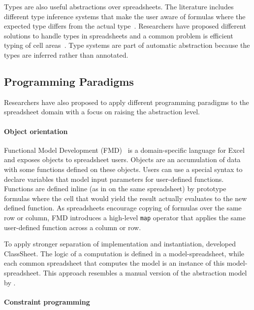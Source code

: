 \documentclass[a4paper]{article}
\begin{document}
Types are also useful abstractions over spreadsheets. The literature
includes different type inference systems that make the user aware of
formulas where the expected type differs from the actual
type~\cite{Abraham:2006:TIS:1140335.1140346,
  Cheng2015Static}. Researchers have proposed different solutions to
handle types in spreadsheets and a common problem is efficient typing
of cell areas~\cite{Abraham:2006:TIS:1140335.1140346,
  Cheng2012Abstract}. Type systems are part of automatic abstraction
because the types are inferred rather than annotated.

\subsection{Programming Paradigms}
\label{sec:progr-parad}

Researchers have also proposed to apply different programming
paradigms to the spreadsheet domain with a focus on raising the
abstraction level.

\paragraph{Object orientation}

Functional Model Development
(FMD)~\cite{Benfield:2009:FFD:1668113.1668121} is a domain-specific
language for Excel and exposes objects to spreadsheet users. Objects
are an accumulation of data with some functions defined on these
objects. Users can use a special syntax to declare variables that
model input parameters for user-defined functions. Functions are
defined inline (as in on the same spreadsheet) by prototype formulas
where the cell that would yield the result actually evaluates to the
new defined function. As spreadsheets encourage copying of formulas
over the same row or column, FMD introduces a high-level \texttt{map}
operator that applies the same user-defined function across a column
or row.

To apply stronger separation of implementation and instantiation,
\citet{6070409} developed ClassSheet. The logic of a computation is
defined in a model-spreadsheet, while each common spreadsheet that
computes the model is an instance of this model-spreadsheet. This
approach resembles a manual version of the abstraction model by
\citet{Isakowitz:1995:TLT:195705.195708}.

\paragraph{Constraint programming}
\end{document}
